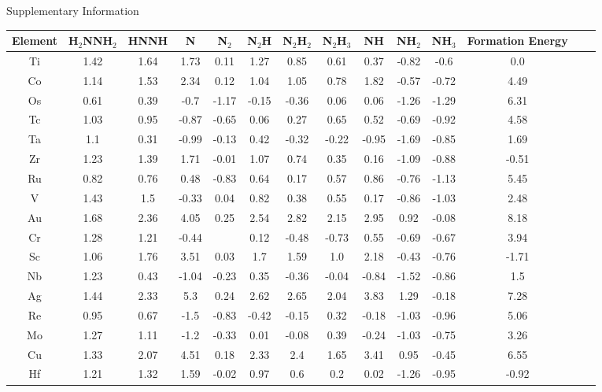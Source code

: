 Supplementary Information
\onecolumn
\begin{table}
\begin{center}
\begin{tabular}{| c | c | c | c | c | c | c | c | c | c | c | c | c | c |}
\hline
Element & H$_2$NNH$_2$ & HNNH & N & N$_2$ & N$_2$H & N$_2$H$_2$ & N$_2$H$_3$ & NH & NH$_2$ & NH$_3$ & Formation Energy\\
\hline

Ti & 1.42 & 1.64 & 1.73 & 0.11 & 1.27 & 0.85 & 0.61 & 0.37 & -0.82 & -0.6 & 0.0 \\
Co & 1.14 & 1.53 & 2.34 & 0.12 & 1.04 & 1.05 & 0.78 & 1.82 & -0.57 & -0.72 & 4.49 \\
Os & 0.61 & 0.39 & -0.7 & -1.17 & -0.15 & -0.36 & 0.06 & 0.06 & -1.26 & -1.29 & 6.31 \\
Tc & 1.03 & 0.95 & -0.87 & -0.65 & 0.06 & 0.27 & 0.65 & 0.52 & -0.69 & -0.92 & 4.58 \\
Ta & 1.1 & 0.31 & -0.99 & -0.13 & 0.42 & -0.32 & -0.22 & -0.95 & -1.69 & -0.85 & 1.69 \\
Zr & 1.23 & 1.39 & 1.71 & -0.01 & 1.07 & 0.74 & 0.35 & 0.16 & -1.09 & -0.88 & -0.51 \\
Ru & 0.82 & 0.76 & 0.48 & -0.83 & 0.64 & 0.17 & 0.57 & 0.86 & -0.76 & -1.13 & 5.45 \\
V & 1.43 & 1.5 & -0.33 & 0.04 & 0.82 & 0.38 & 0.55 & 0.17 & -0.86 & -1.03 & 2.48 \\
Au & 1.68 & 2.36 & 4.05 & 0.25 & 2.54 & 2.82 & 2.15 & 2.95 & 0.92 & -0.08 & 8.18 \\
Cr & 1.28 & 1.21 & -0.44 &  & 0.12 & -0.48 & -0.73 & 0.55 & -0.69 & -0.67 & 3.94 \\
Sc & 1.06 & 1.76 & 3.51 & 0.03 & 1.7 & 1.59 & 1.0 & 2.18 & -0.43 & -0.76 & -1.71 \\
Nb & 1.23 & 0.43 & -1.04 & -0.23 & 0.35 & -0.36 & -0.04 & -0.84 & -1.52 & -0.86 & 1.5 \\
Ag & 1.44 & 2.33 & 5.3 & 0.24 & 2.62 & 2.65 & 2.04 & 3.83 & 1.29 & -0.18 & 7.28 \\
Re & 0.95 & 0.67 & -1.5 & -0.83 & -0.42 & -0.15 & 0.32 & -0.18 & -1.03 & -0.96 & 5.06 \\
Mo & 1.27 & 1.11 & -1.2 & -0.33 & 0.01 & -0.08 & 0.39 & -0.24 & -1.03 & -0.75 & 3.26 \\
Cu & 1.33 & 2.07 & 4.51 & 0.18 & 2.33 & 2.4 & 1.65 & 3.41 & 0.95 & -0.45 & 6.55 \\
Hf & 1.21 & 1.32 & 1.59 & -0.02 & 0.97 & 0.6 & 0.2 & 0.02 & -1.26 & -0.95 & -0.92 \\

\end{tabular}
\end{center}
\end{table}
